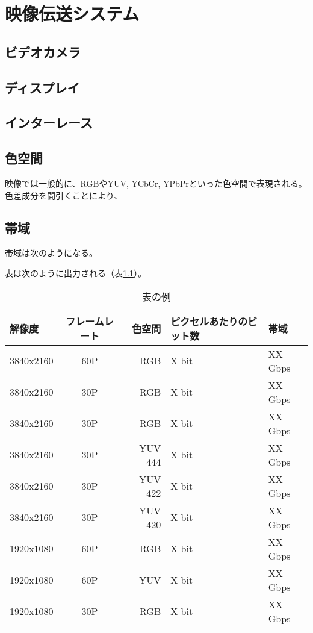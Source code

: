 \chapter{映像伝送システム}
\label{chap:video-transmission}
\section{ビデオカメラ}
\section{ディスプレイ}
\section{インターレース}
\section{色空間}

映像では一般的に、RGBやYUV, YCbCr, YPbPrといった色空間で表現される。
色差成分を間引くことにより、

\section{帯域}

帯域は次のようになる。

表は次のように出力される（表\ref{tb:video-bandwidth}）。

\begin{table}[htbp]
  \caption{表の例}
  \label{tb:video-bandwidth}
  \begin{center}
  \begin{tabular}{l|c|r|l|l}
    \hline
    解像度&フレームレート&色空間&ピクセルあたりのビット数&帯域\\\hline\hline
    3840x2160&60P&RGB&X bit&XX Gbps\\\hline
    3840x2160&30P&RGB&X bit&XX Gbps\\\hline
    3840x2160&30P&RGB&X bit&XX Gbps\\\hline
    3840x2160&30P&YUV 444&X bit&XX Gbps\\\hline
    3840x2160&30P&YUV 422&X bit&XX Gbps\\\hline
    3840x2160&30P&YUV 420&X bit&XX Gbps\\\hline
    1920x1080&60P&RGB&X bit&XX Gbps\\\hline
    1920x1080&60P&YUV&X bit&XX Gbps\\\hline
    1920x1080&30P&RGB&X bit&XX Gbps\\\hline
  \end{tabular}\end{center}
\end{table}


